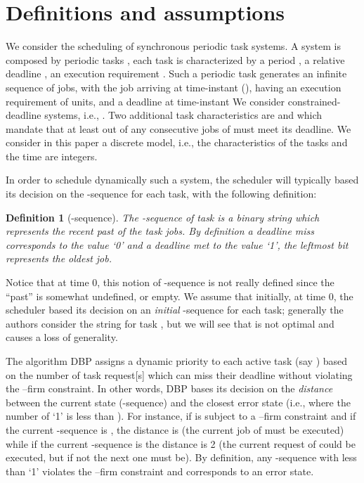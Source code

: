 \documentclass{article}
\newtheorem{Definition}{Definition}
\begin{document}
\section{Definitions and assumptions}\label{sec:model}

We consider the scheduling of synchronous periodic task systems. A
system  is composed by  periodic tasks , each task is characterized by a
period , a relative deadline , an execution requirement 
. Such a periodic task generates an
infinite sequence of jobs, with the  job
arriving at time-instant  (), having an execution requirement of  units,
and a deadline at time-instant  We consider constrained-deadline systems, i.e., . Two additional task characteristics are  and  which mandate that at least  out of any  consecutive jobs of  must meet its deadline. We consider in this paper a discrete model, i.e., the characteristics of the tasks and the time are integers. 

In order to schedule dynamically such a system, the scheduler will typically based its decision on the -sequence for each task, with the following definition:

\begin{Definition}[-sequence]\label{def:kseq}
The -sequence of task  is a binary string  which represents the recent past of the task jobs. By definition a deadline miss corresponds to the value `0' and a deadline met to the value `1', the leftmost bit represents the oldest job.
\end{Definition}

Notice that at time 0, this notion of -sequence is not really defined since the ``past'' is somewhat  undefined, or empty. We assume that initially, at time 0, the scheduler based its decision on an \emph{initial} -sequence for each task; generally the authors consider the string  for task , but we will see that is not optimal and causes a loss of generality.

The algorithm DBP assigns a dynamic priority to each active task (say ) based on the number of task request[s] which can miss their deadline without violating the --firm constraint. In other words, DBP bases its decision on the \emph{distance} between the current state (-sequence) and the closest error state (i.e., where the number of `1' is less than ). For instance, if  is subject to a --firm constraint and if the current -sequence is , the distance is  (the current job of  must be executed) while if the current -sequence is  the distance is 2 (the current request of  could be executed, but if not the next one must be). By definition, any -sequence with less than  `1' violates the --firm constraint and corresponds to an error state.
\end{document}
